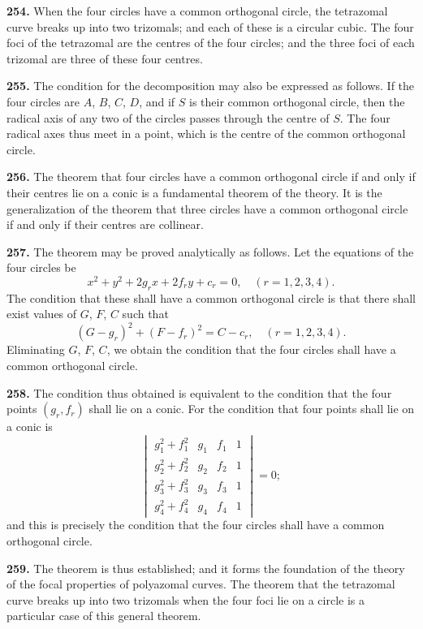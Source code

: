 \documentclass[12pt,a4paper]{article}
\theoremstyle{definition}
\begin{document}
\noindent\textbf{254.} When the four circles have a common orthogonal circle, the tetrazomal
curve breaks up into two trizomals; and each of these is a circular cubic. The four
foci of the tetrazomal are the centres of the four circles; and the three foci of each
trizomal are three of these four centres.

\noindent\textbf{255.} The condition for the decomposition may also be expressed as follows.
If the four circles are $A$, $B$, $C$, $D$, and if $S$ is their common orthogonal circle, then
the radical axis of any two of the circles passes through the centre of $S$. The four
radical axes thus meet in a point, which is the centre of the common orthogonal circle.

\noindent\textbf{256.} The theorem that four circles have a common orthogonal circle if and only
if their centres lie on a conic is a fundamental theorem of the theory. It is the
generalization of the theorem that three circles have a common orthogonal circle if and
only if their centres are collinear.

\noindent\textbf{257.} The theorem may be proved analytically as follows. Let the equations
of the four circles be
\[
x^2 + y^2 + 2g_rx + 2f_ry + c_r = 0, \quad (r = 1, 2, 3, 4).
\]
The condition that these shall have a common orthogonal circle is that there shall exist
values of $G$, $F$, $C$ such that
\[
(G - g_r)^2 + (F - f_r)^2 = C - c_r, \quad (r = 1, 2, 3, 4).
\]
Eliminating $G$, $F$, $C$, we obtain the condition that the four circles shall have a common
orthogonal circle.

\newpage
\noindent\textbf{258.} The condition thus obtained is equivalent to the condition that the
four points $(g_r, f_r)$ shall lie on a conic. For the condition that four points shall lie
on a conic is
\[
\begin{vmatrix}
g_1^2 + f_1^2 & g_1 & f_1 & 1 \\
g_2^2 + f_2^2 & g_2 & f_2 & 1 \\
g_3^2 + f_3^2 & g_3 & f_3 & 1 \\
g_4^2 + f_4^2 & g_4 & f_4 & 1
\end{vmatrix}
= 0;
\]
and this is precisely the condition that the four circles shall have a common orthogonal
circle.

\noindent\textbf{259.} The theorem is thus established; and it forms the foundation of the
theory of the focal properties of polyazomal curves. The theorem that the tetrazomal
curve breaks up into two trizomals when the four foci lie on a circle is a particular
case of this general theorem.
\end{document}
